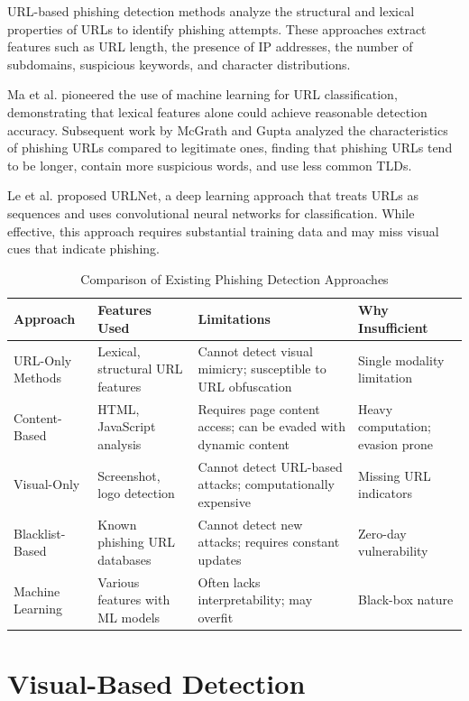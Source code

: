 \documentclass[12pt,a4paper]{report}
\begin{document}
URL-based phishing detection methods analyze the structural and lexical properties of URLs to identify phishing attempts. These approaches extract features such as URL length, the presence of IP addresses, the number of subdomains, suspicious keywords, and character distributions.

Ma et al. \cite{ma2009beyond} pioneered the use of machine learning for URL classification, demonstrating that lexical features alone could achieve reasonable detection accuracy. Subsequent work by McGrath and Gupta \cite{mcgrath2008behind} analyzed the characteristics of phishing URLs compared to legitimate ones, finding that phishing URLs tend to be longer, contain more suspicious words, and use less common TLDs.

Le et al. \cite{le2018urlnet} proposed URLNet, a deep learning approach that treats URLs as sequences and uses convolutional neural networks for classification. While effective, this approach requires substantial training data and may miss visual cues that indicate phishing.

\begin{table}[h!]
\centering
\caption{Comparison of Existing Phishing Detection Approaches}
\label{tab:comparison}
\begin{tabular}{|p{2.5cm}|p{4cm}|p{4cm}|p{3cm}|}
\hline
\textbf{Approach} & \textbf{Features Used} & \textbf{Limitations} & \textbf{Why Insufficient} \\
\hline
URL-Only Methods & Lexical, structural URL features & Cannot detect visual mimicry; susceptible to URL obfuscation & Single modality limitation \\
\hline
Content-Based & HTML, JavaScript analysis & Requires page content access; can be evaded with dynamic content & Heavy computation; evasion prone \\
\hline
Visual-Only & Screenshot, logo detection & Cannot detect URL-based attacks; computationally expensive & Missing URL indicators \\
\hline
Blacklist-Based & Known phishing URL databases & Cannot detect new attacks; requires constant updates & Zero-day vulnerability \\
\hline
Machine Learning & Various features with ML models & Often lacks interpretability; may overfit & Black-box nature \\
\hline
\end{tabular}
\end{table}

\section{Visual-Based Detection}
\end{document}
